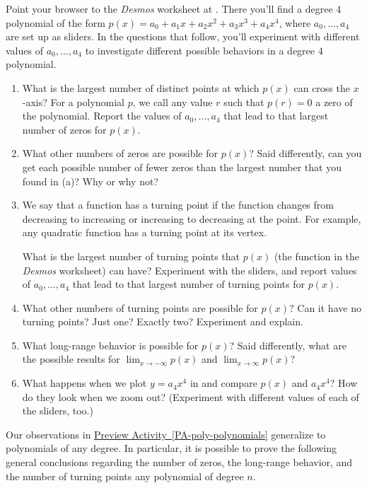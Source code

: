 \documentclass{ximera}
\begin{document}
\begin{exploration}
Point your browser to the \emph{Desmos} worksheet at .  There you'll find a degree $4$ polynomial of the form $p(x) = a_0 + a_1x + a_2x^2 + a_3x^3 + a_4x^4$, where $a_0, \ldots, a_4$ are set up as sliders.  In the questions that follow, you'll experiment with different values of $a_0, \ldots, a_4$ to investigate different possible behaviors in a degree $4$ polynomial.%
\begin{enumerate}[label=\alph*.]
\item What is the largest number of distinct points at which $p(x)$ can cross the $x$-axis?%
For a polynomial $p$, we call any value $r$ such that $p(r) = 0$ a zero of the polynomial.  Report the values of $a_0, \ldots, a_4$ that lead to that largest number of zeros for $p(x)$.%
\item What other numbers of zeros are possible for $p(x)$?  Said differently, can you get each possible number of fewer zeros than the largest number that you found in (a)? Why or why not?%
\item We say that a function has a turning point  if the function changes from decreasing to increasing or increasing to decreasing at the point.  For example, any quadratic function has a turning point at its vertex.%

What is the largest number of turning points that $p(x)$ (the function in the \emph{Desmos} worksheet) can have?  Experiment with the sliders, and report values of $a_0, \ldots, a_4$ that lead to that largest number of turning points for $p(x)$.%
\item What other numbers of turning points are possible for $p(x)$? Can it have no turning points?  Just one?  Exactly two? Experiment and explain.%
\item What long-range behavior is possible for $p(x)$?  Said differently, what are the possible results for $\displaystyle \lim_{x \to -\infty} p(x)$ and $\displaystyle \lim_{x \to \infty} p(x)$?%
\item What happens when we plot $y = a_4 x^4$ in and compare $p(x)$ and $a_4 x^4$?  How do they look when we zoom out? (Experiment with different values of each of the sliders, too.)%
\end{enumerate}
%
\end{exploration}

%
%
%
Our observations in \hyperref[PA-poly-polynomials]{Preview Activity~\ref{PA-poly-polynomials}} generalize to polynomials of any degree.  In particular, it is possible to prove the following general conclusions regarding the number of zeros, the long-range behavior, and the number of turning points any polynomial of degree $n$.%
\end{document}
